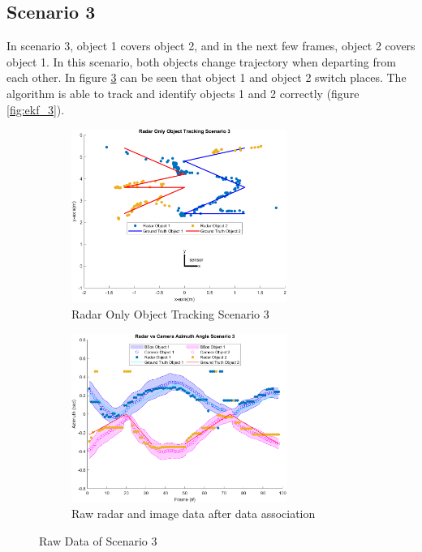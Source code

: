 \subsection{Scenario 3}\label{sec:3-exp_result3}
In scenario 3, object 1 covers object 2, and in the next few frames, object 2 covers object 1.
In this scenario, both objects change trajectory when departing from each other.
In figure \ref*{fig:raw_3} can be seen that object 1 and object 2 switch places.
The algorithm is able to track and identify objects 1 and 2 correctly (figure \ref*{fig:ekf_3}).
\begin{figure}[!htb]
    \hspace{0.1\textwidth}
    \begin{subfigure}[b]{0.35\textwidth}%
        \includegraphics[width=7cm]{Figures/matlab/Radar Only Object Tracking Scenario 3.png}
        \caption{Radar Only Object Tracking Scenario 3}
        \label{subfig:radar_3}
    \end{subfigure}
    \hspace{0.1\textwidth}
    \begin{subfigure}[b]{0.35\textwidth}%
        \includegraphics[width=7cm]{Figures/matlab/Radar vs Camera Azimuth Angle Scenario 3.png}
        \caption{Raw radar and image data after data association}
        \label{subfig:raw_fusion_3}
    \end{subfigure}

    \caption{Raw Data of Scenario 3}
    \label{fig:raw_3}
\end{figure}
